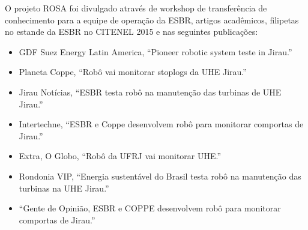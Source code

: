 O projeto ROSA foi divulgado através de workshop de transferência de
conhecimento para a equipe de operação da ESBR, artigos acadêmicos, filipetas no
estande da ESBR no CITENEL 2015 e nas seguintes publicações:

\begin{itemize}
\item GDF Suez Energy Latin America, ``Pioneer robotic system teste in Jirau.''
\item Planeta Coppe, ``Robô vai monitorar stoplogs da UHE Jirau.''
\item Jirau Notícias, ``ESBR testa robô na manutenção das turbinas de UHE Jirau.''
\item Intertechne, ``ESBR e Coppe desenvolvem robô para monitorar comportas de
 Jirau.''
\item Extra, O Globo, ``Robô da UFRJ vai monitorar UHE.''
\item Rondonia VIP, ``Energia sustentável do Brasil testa robô na manutenção das
 turbinas na UHE Jirau.''
\item ``Gente de Opinião, ESBR e COPPE desenvolvem robô para monitorar comportas
de Jirau.''
\end{itemize}